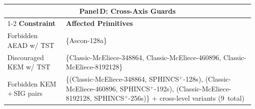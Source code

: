 \begin{table}[!t]
\vspace{6pt}

\begin{tabular}{@{}lp{}@{}}
\toprule
\multicolumn{2}{c}{\textbf{Panel\,D: Cross-Axis Guards}} \\
\cmidrule{1-2}
\textbf{Constraint} & \textbf{Affected Primitives} \\
\midrule
Forbidden AEAD w/ \textsc{TST}
  & \{Ascon-128a\} \\
\addlinespace
Discouraged KEM w/ \textsc{TST}
  & \{Classic-McEliece-348864, Classic-McEliece-460896, Classic-McEliece-8192128\} \\
\addlinespace
Forbidden KEM\,+\,SIG pairs
  & \{(Classic-McEliece-348864, SPHINCS$^+$-128s),
     (Classic-McEliece-460896, SPHINCS$^+$-192s),
     (Classic-McEliece-8192128, SPHINCS$^+$-256s)\}
     + cross-level variants (9~total) \\
\bottomrule
\end{tabular}
\end{table}


